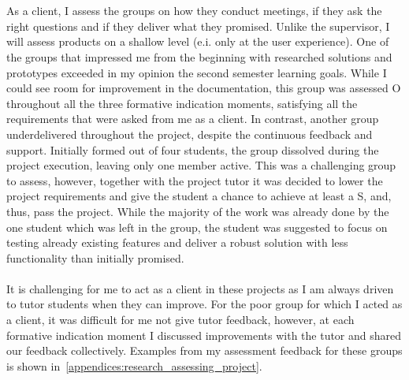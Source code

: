\\\\
As a client, I assess the groups on how they conduct meetings, if they ask the right questions and if they deliver what they promised. 
Unlike the supervisor, I will assess products on a shallow level (e.i. only at the user experience). One of the groups that impressed me from the beginning with researched solutions and prototypes exceeded in my opinion the second semester learning goals. While I could see room for improvement in the documentation, this group was assessed O throughout all the three formative indication moments, satisfying all the requirements that were asked from me as a client. In contrast, another group underdelivered throughout the project, despite the continuous feedback and support. Initially formed out of four students, the group dissolved during the project execution, leaving only one member active. This was a challenging group to assess, however, together with the project tutor it was decided to lower the project requirements and give the student a chance to achieve at least a S, and, thus, pass the project. While the majority of the work was already done by the one student which was left in the group, the student was suggested to focus on testing already existing features and deliver a robust solution with less functionality than initially promised. 
\\\\
It is challenging for me to act as a client in these projects as I am always driven to tutor students when they can improve. For the poor group for which I acted as a client, it was difficult for me not give tutor feedback, however, at each formative indication moment I discussed improvements with the tutor and shared our feedback collectively. Examples from my assessment feedback for these groups is shown in~\cref{appendices:research_assessing_project}.